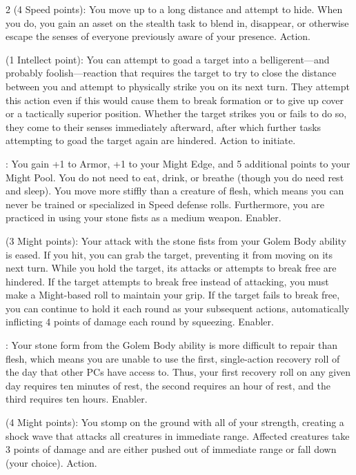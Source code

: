 \begin{multicols}{2}
 (4 Speed points): You move up to a long distance and attempt to hide. When you do, you gain an asset on the stealth task to blend in, disappear, or otherwise escape the senses of everyone previously aware of your presence. Action. 
 
 (1 Intellect point): You can attempt to goad a target into a belligerent—and probably foolish—reaction that requires the target to try to close the distance between you and attempt to physically strike you on its next turn. They attempt this action even if this would cause them to break formation or to give up cover or a tactically superior position. Whether the target strikes you or fails to do so, they come to their senses immediately afterward, after which further tasks attempting to goad the target again are hindered. Action to initiate. 
 
: You gain +1 to Armor, +1 to your Might Edge, and 5 additional points to your Might Pool. You do not need to eat, drink, or breathe (though you do need rest and sleep). You move more stiffly than a creature of flesh, which means you can never be trained or specialized in Speed defense rolls. Furthermore, you are practiced in using your stone fists as a medium weapon. Enabler. 
 
 (3 Might points): Your attack with the stone fists from your Golem Body ability is eased. If you hit, you can grab the target, preventing it from moving on its next turn. While you hold the target, its attacks or attempts to break free are hindered. If the target attempts to break free instead of attacking, you must make a Might-based roll to maintain your grip. If the target fails to break free, you can continue to hold it each round as your subsequent actions, automatically inflicting 4 points of damage each round by squeezing. Enabler. 
 
: Your stone form from the Golem Body ability is more difficult to repair than flesh, which means you are unable to use the first, single-action recovery roll of the day that other PCs have access to. Thus, your first recovery roll on any given day requires ten minutes of rest, the second requires an hour of rest, and the third requires ten hours. Enabler. 
 
 (4 Might points): You stomp on the ground with all of your strength, creating a shock wave that attacks all creatures in immediate range. Affected creatures take 3 points of damage and are either pushed out of immediate range or fall down (your choice). Action. 
 

\end{multicols}
